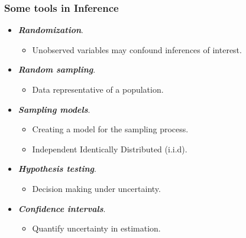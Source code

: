 \documentclass[10pt,article]{article}
\begin{document}
\subsubsection{Some tools in Inference}
\label{sec:orgcbe30e6}
\begin{itemize}
\item \textbf{\emph{Randomization}}.
\begin{itemize}
\item Unobserved variables may confound inferences of interest.
\end{itemize}

\item \textbf{\emph{Random sampling}}.
\begin{itemize}
\item Data representative of a population.
\end{itemize}

\item \textbf{\emph{Sampling models}}.
\begin{itemize}
\item Creating a model for the sampling process.
\item Independent Identically Distributed (i.i.d).
\end{itemize}

\item \textbf{\emph{Hypothesis testing}}.
\begin{itemize}
\item Decision making under uncertainty.
\end{itemize}

\item \textbf{\emph{Confidence intervals}}.
\begin{itemize}
\item Quantify uncertainty in estimation.
\end{itemize}
\end{itemize}
\end{document}
